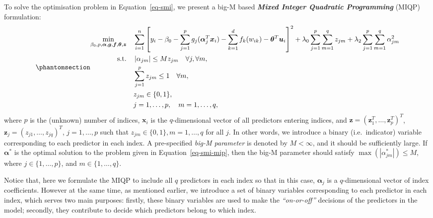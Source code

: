 \documentclass[
  11pt,
  a4paper,
]{article}
\begin{document}
To solve the optimisation problem in Equation~\ref{eq-smi}, we present a
big-M based \textbf{\emph{Mixed Integer Quadratic Programming}} (MIQP)
formulation: \begin{equation}\phantomsection\label{eq-smi-mip}{
\begin{aligned}
  \min_{\beta_{0}, p, \bm{\alpha}, \bm{g}, \bm{f}, \bm{\theta}, \bm{z}} \quad & \sum_{i = 1}^{n}\left [ y_{i} - \beta_{0} - \sum_{j = 1}^{p}{g_{j}(\bm{\alpha}_{j}^{T}\bm{x}_{i})} - \sum_{k = 1}^{d} {f_{k}(w_{ik})} - \bm{\theta}^{T}\bm{u}_{i}\right ]^{2} + \lambda_{0}\sum_{j = 1}^{p}\sum_{m = 1}^{q}z_{jm} + \lambda_{2}\sum_{j = 1}^{p}\sum_{m = 1}^{q} \alpha_{jm}^{2} \\
  \text{s.t.} \quad & \left |\alpha_{jm}\right | \le Mz_{jm} \quad \forall j, \forall m, \\
  & \sum_{j = 1}^{p}z_{jm} \le 1 \quad \forall m, \\
  & z_{jm} \in \{0, 1\}, \\
  & j = 1, \dots, p, \quad m = 1, \dots, q,
\end{aligned}
}\end{equation} where \(p\) is the (unknown) number of indices,
\(\bm{x}_{i}\) is the \(q\)-dimensional vector of all predictors
entering indices, and
\(\bm{z} = \left (\bm{z}_{1}^{T}, \dots, \bm{z}_{p}^{T} \right )^{T}\),
\(\bm{z}_{j} = \left (z_{j1}, \dots, z_{jq} \right )^{T}\),
\(j = 1, \dots, p\) such that \(z_{jm} \in \{0, 1\}, m = 1, \dots, q\)
for all \(j\). In other words, we introduce a binary (i.e.~indicator)
variable corresponding to each predictor in each index. A pre-specified
\emph{big-M parameter} is denoted by \(M < \infty\), and it should be
sufficiently large. If \(\bm{\alpha^{*}}\) is the optimal solution to
the problem given in Equation~\ref{eq-smi-mip}, then the big-M parameter
should satisfy
\(\max \left (\left |\alpha_{jm}^{*}\right | \right ) \le M\), where
\(j \in \{1, \dots, p\}\), and \(m \in \{1, \dots, q\}\).

Notice that, here we formulate the MIQP to include all \(q\) predictors
in each index so that in this case, \(\bm{\alpha}_{j}\) is a
\(q\)-dimensional vector of index coefficients. However at the same
time, as mentioned earlier, we introduce a set of binary variables
corresponding to each predictor in each index, which serves two main
purposes: firstly, these binary variables are used to make the
\emph{``on-or-off''} decisions of the predictors in the model; secondly,
they contribute to decide which predictors belong to which index.
\end{document}
